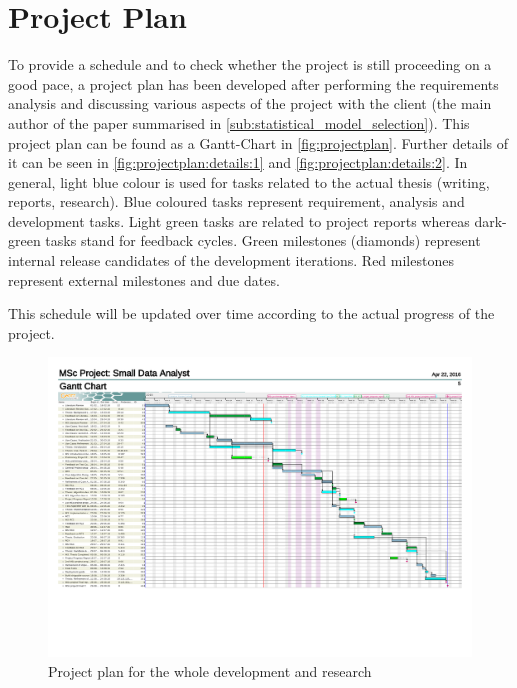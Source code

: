 \section{Project Plan}
\label{sec:projectplan}
To provide a schedule and to check whether the project is still proceeding on a good pace, a project plan has been developed after performing the requirements analysis and discussing various aspects of the project with the client (the main author of the paper summarised in \autoref{sub:statistical_model_selection}). This project plan can be found as a Gantt-Chart in \autoref{fig:projectplan}. Further details of it can be seen in \autoref{fig:projectplan:details:1} and \autoref{fig:projectplan:details:2}. In general, light blue colour is used for tasks related to the actual thesis (writing, reports, research). Blue coloured tasks represent requirement, analysis and development tasks. Light green tasks are related to project reports whereas dark-green tasks stand for feedback cycles. Green milestones (diamonds) represent internal release candidates of the development iterations. Red milestones represent external milestones and due dates. 

This schedule will be updated over time according to the actual progress of the project.

\begin{figure}
	\centering
	\includegraphics[page=1,width=\textwidth]{appendix/Projectplan.pdf}
	\caption{Project plan for the whole development and research}
	\label{fig:projectplan}
\end{figure}


